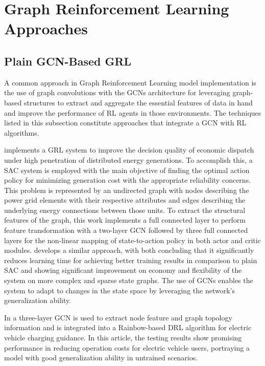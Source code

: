 \section{Graph Reinforcement Learning Approaches}

\subsection{Plain GCN-Based GRL}

A common approach in Graph Reinforcement Learning model implementation is the use of graph convolutions with the \acp{GCN} architecture for leveraging graph-based structures to extract and aggregate the essential features of data in hand and improve the performance of \ac{RL} agents in those environments. The techniques listed in this subsection constitute approaches that integrate a \ac{GCN} with \ac{RL} algorithms.\par
\cite{liNovelGraphReinforcement2022} implements a \ac{GRL} system to improve the decision quality of economic dispatch under high penetration of distributed energy generations. To accomplish this, a \ac{SAC} system is employed with the main objective of finding the optimal action policy for minimizing generation cost with the appropriate reliability concerns. This problem is represented by an undirected graph with nodes describing the power grid elements with their respective attributes and edges describing the underlying energy connections between those units. To extract the structural features of the graph, this work implements a full connected layer to perform feature transformation with a two-layer \ac{GCN} followed by three full connected layers for the non-linear mapping of state-to-action policy in both actor and critic modules. \cite{chenScalableGraphReinforcement2023} develops a similar approach, with both concluding that it significantly reduces learning time for achieving better training results in comparison to plain \ac{SAC} and showing significant improvement on economy and flexibility of the system on more complex and sparse state graphs. The use of \acp{GCN} enables the system to adapt to changes in the state space by leveraging the network's generalization ability.\par
In \cite{xingGraphReinforcementLearningBased2023} a three-layer \ac{GCN} is used to extract node feature and graph topology information and is integrated into a Rainbow-based \cite{hesselRainbowCombiningImprovements2018} \ac{DRL} algorithm for electric vehicle charging guidance. In this article, the testing results show promising performance in reducing operation costs for electric vehicle users, portraying a model with good generalization ability in untrained scenarios. \par
